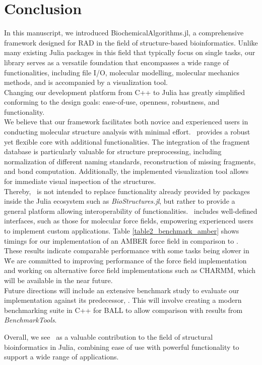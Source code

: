 

\section{Conclusion}

In this manuscript, we introduced BiochemicalAlgorithms.jl, a comprehensive framework designed for RAD in the field of structure-based bioinformatics. Unlike many existing Julia packages in this field that typically focus on single tasks, our library serves as a versatile foundation that encompasses a wide range of functionalities, including file I/O, molecular modelling, molecular mechanics methods, and is accompanied by a visualization tool.\\
Changing our development platform from C++ to Julia has greatly simplified conforming to the design goals: ease-of-use, openness, robustness, and functionality. \\

We believe that our framework facilitates both novice and experienced users in conducting molecular structure analysis with minimal effort. \biochem\ provides a robust yet flexible core with additional functionalities. The integration of the fragment database is particularly valuable for structure preprocessing, including normalization of different naming standards, reconstruction of missing fragments, and bond computation. Additionally, the implemented visualization tool allows for immediate visual inspection of the structures. \\
Thereby, \biochem\ is not intended to replace functionality already provided by packages inside the Julia ecosystem such as \textit{BioStructures.jl}, but rather to provide a general platform allowing interoperability of functionalities. 
\biochem\ includes well-defined interfaces, such as those for molecular force fields, empowering experienced users to implement custom applications.  Table \ref{table2_benchmark_amber} shows timings for our implementation of an AMBER force field in comparison to \ball. These results indicate comparable performance with some tasks being slower in \biochem\. We are committed to improving performance of the force field implementation and working on alternative force field implementations such as CHARMM, which will be available in the near future. \\

Future directions will include an extensive benchmark study to evaluate our implementation against its predecessor, \ball. This will involve creating a modern benchmarking suite in C++ for BALL to allow comparison with results from \textit{BenchmarkTools}.

Overall, we see \biochem\ as a valuable contribution to the field of structural bioinformatics in Julia, combining ease of use with powerful functionality to support a wide range of applications.
